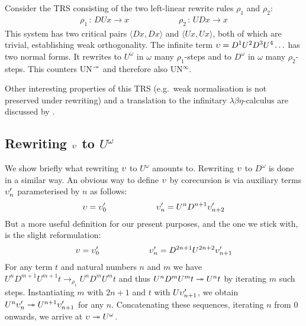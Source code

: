 Consider the TRS consisting of the two left-linear rewrite rules
$\rho_1$ and $\rho_2$:
\begin{align*}
  \rho_1 \, : \, DUx \to x \qquad \qquad \qquad
  \rho_2 \, : \, UDx \to x
\end{align*}
This system has two critical pairs $\langle Dx, Dx \rangle$ and
$\langle Ux, Ux \rangle$, both of which are trivial, establishing
weak orthogonality. The infinite term $\upsilon = D^1 U^2 D^3 U^4 \ldots$
has two normal forms. It rewrites to $U^\omega$ in $\omega$ many
$\rho_1$-steps and to $D^\omega$ in $\omega$ many $\rho_2$-steps.
This counters UN$^{\twoheadrightarrow}$ and therefore also UN$^\infty$.

Other interesting properties of this TRS (e.g.\ weak normalisation is
not preserved under rewriting) and a translation to the infinitary
$\lambda \beta \eta$-calculus are discussed by \citet{endrullis-10}.


\subsection{\texorpdfstring{Rewriting $\upsilon$ to
    $U^\omega$}{Rewriting DUUDDD... to
    UUU...}}\label{sub:counterexample}

We show briefly what rewriting $\upsilon$ to $U^\omega$ amounts
to. Rewriting $\upsilon$ to $D^\omega$ is done in a similar way.
An obvious way to define $\upsilon$ by corecursion is via auxiliary terms
$\upsilon'_n$ parameterised by $n$ as follows:
\begin{align*}
  \upsilon = \upsilon'_0 \qquad \qquad \qquad
  \upsilon'_n = U^n D^{n + 1} \upsilon'_{n + 2}
\end{align*}
But a more useful definition for our present purposes, and the one we
stick with, is the slight reformulation:
\begin{align*}
  \upsilon = \upsilon'_0 \qquad \qquad \qquad
  \upsilon'_n = D^{2 n + 1} U^{2 n + 2} \upsilon'_{n + 1}
\end{align*}
For any term $t$ and natural numbers $n$ and $m$ we have $U^n D^{m+1}
U^{m+1} t \rightarrow_{\rho_1} U^n D^m U^m t$ and thus $U^n D^m U^m t
\twoheadrightarrow U^n t$ by iterating $m$ such steps. Instantiating
$m$ with $2 n + 1$ and $t$ with $U \upsilon'_{n + 1}$, we obtain
$U^n \upsilon'_n \twoheadrightarrow U^{n+1} \upsilon'_{n + 1}$ for any $n$.
Concatenating these sequences, iterating $n$ from $0$ onwards, we
arrive at $\upsilon \twoheadrightarrow U^\omega$.


